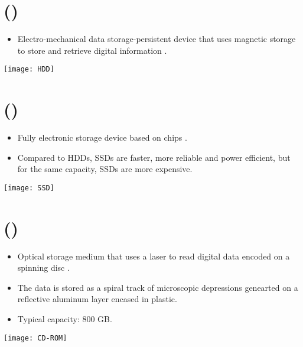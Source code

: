 \section{ ()}
\begin{itemize}
\item Electro-mechanical data storage-persistent device that uses
  magnetic storage to store and retrieve digital information
  \cite{wikipedia_NDD}.
\end{itemize}
\vspace{-4ex}
\begin{center}
  \texttt{[image: HDD]}
\end{center}

\section{ ()}
\begin{itemize}
\item Fully electronic storage device based on  chips \cite{wikipedia_SSD}.
\item Compared to \gls{HDD}s, \gls{SSD}s are faster, more reliable and
  power efficient, but for the same capacity, \gls{SSD}s are more
  expensive.
\end{itemize}
\vspace{-4ex}
\begin{center}
  \texttt{[image: SSD]}
\end{center}

\section{ ({)}}
\begin{itemize}
\item Optical storage medium that uses a laser to read digital data
  encoded on a spinning disc \cite{wikipedia_CD-ROM}.
\item The data is stored as a spiral track of microscopic depressions
  genearted on a reflective aluminum layer encased in plastic.
\item Typical capacity: 800 GB.
\end{itemize}
\vspace{-4ex}
\begin{center}
  \texttt{[image: CD-ROM]}
\end{center}
  
